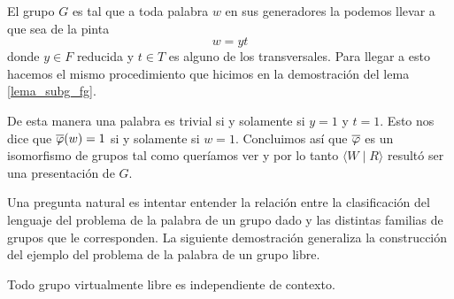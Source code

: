 \documentclass[tesis.tex]{subfiles}
\begin{document}
\begin{obs}
	El grupo  $G$ es tal que a toda palabra $w$ en sus generadores la podemos llevar a que sea de la pinta
	\[
	w = yt
	\]
	donde $y \in F$ reducida y $t \in T$ es alguno de los transversales. 
	Para llegar a esto hacemos el mismo procedimiento que hicimos en la demostración del lema \ref{lema_subg_fg}.
	
	De esta manera una palabra es trivial si y solamente si $y=1$ y $t=1$. 
	Esto nos dice que $\overline \varphi(w) = 1$ si y solamente si $w=1$. 
	Concluimos así que $\overline \varphi$ es un isomorfismo de grupos tal como queríamos ver y por lo tanto  $\langle W \mid R \rangle$ resultó ser una presentación de $G$.
	
\end{obs}
\medskip







Una pregunta natural es intentar entender la relación entre la clasificación del lenguaje del problema de la palabra de un grupo dado y las distintas familias de grupos que le corresponden. 
La siguiente demostración generaliza la construcción del ejemplo del problema de la palabra de un grupo libre.


\begin{teo}\cite{muller1983groups}
	Todo grupo virtualmente libre es independiente de contexto.
\end{teo}
\end{document}
